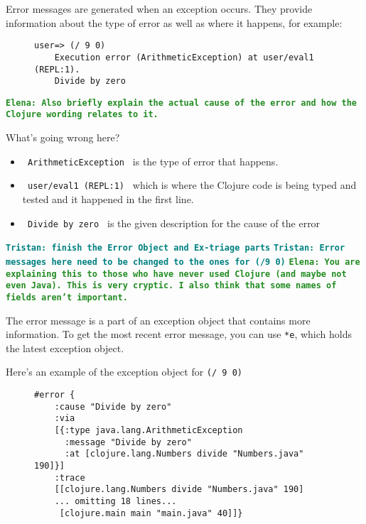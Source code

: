 \documentclass[12pt]{article}
\newcommand{\comment}[1]{{\bf \tt  {#1}}}
\newcommand{\emcomment}[1]{\textcolor{ForestGreen}{\comment{Elena: {#1}}}}
\newcommand{\tkcomment}[1]{\textcolor{Teal}{\comment{Tristan: {#1}}}}
\begin{document}
   Error messages are generated when an exception occurs. They provide information about
   the type of error as well as where it happens, for example:

	\begin{figure}[h]
		\centering
		\begin{lstlisting}[breaklines=true, basicstyle=\ttfamily]
	user=> (/ 9 0)
	Execution error (ArithmeticException) at user/eval1 (REPL:1).
	Divide by zero
		\end{lstlisting}
	\end{figure}
\emcomment{Also briefly explain the actual cause of the error and how the Clojure wording relates to it.}	

What’s going wrong here?
	\begin{itemize}
		\item \texttt{ ArithmeticException } is the type of error that happens.
		\item \texttt{ user/eval1 (REPL:1) } which is where the Clojure code is being typed and tested and it happened in the first line.
		\item \texttt{ Divide by zero } is the given description for the cause of the error
	\end{itemize}

	\tkcomment{finish the Error Object and Ex-triage parts}
	\tkcomment{Error messages here need to be changed to the ones for (/9 0)}
\emcomment{You are explaining this to those who have never used Clojure (and maybe not even Java). This is very cryptic. I also think that some names of fields aren't important.}
	
The error message is a part of an exception object that contains more information. To get the most recent error message, you can use \texttt{*e}, which holds the latest exception object.

Here’s an example of the exception object for \texttt{(/ 9 0)}

	\begin{figure}[h]
		\centering
		\begin{lstlisting}[breaklines=true, basicstyle=\ttfamily]
#error {
	:cause "Divide by zero"
	:via
	[{:type java.lang.ArithmeticException
	  :message "Divide by zero"
	  :at [clojure.lang.Numbers divide "Numbers.java" 190]}]
	:trace
	[[clojure.lang.Numbers divide "Numbers.java" 190]
	... omitting 18 lines...
	 [clojure.main main "main.java" 40]]}

		\end{lstlisting}
	\end{figure}
	
\end{document}
